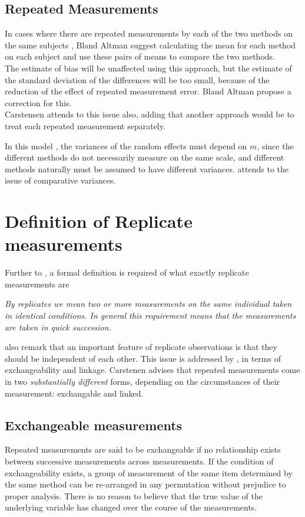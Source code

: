 \subsection{Repeated Measurements }
In cases where there are repeated measurements by each of the two
methods on the same subjects , Bland Altman suggest calculating
the mean for each method on each subject and use these pairs of
means to compare the two methods.
\\
The estimate of bias will be unaffected using this approach, but
the estimate of the standard deviation of the differences will be
too small, because of the reduction of the effect of repeated
measurement error. Bland Altman propose a correction for this.
\\
Carstensen attends to this issue also, adding that another
approach would be to treat each repeated measurement separately.


In this model , the variances of the random effects must depend on
$m$, since the different methods do not necessarily measure on the
same scale, and different methods naturally must be assumed to
have different variances. \citet{BXC2004} attends to the issue of
comparative variances.
\section{Definition of Replicate measurements}
Further to \citet{BA99}, a formal definition is required of what exactly replicate measurements are

\emph{By replicates we mean two or more measurements on the same
individual taken in identical conditions. In general this requirement means that the
measurements are taken in quick succession.}

\citet{BA99} also remark that an important feature of replicate observations is that they should be independent
of each other. This issue is addressed by \citet{bxc2010}, in terms of exchangeability and linkage. Carstenen advises that repeated measurements come in two \emph{substantially different} forms, depending on the circumstances of their measurement: exchangable and linked.
\subsection{Exchangeable measurements}
Repeated measurements are said to be exchangeable if no relationship exists between successive measurements across measurements. If the condition of exchangeability exists, a group of measurement of the same item determined by the same method can be re-arranged in any permutation without prejudice to proper analysis. There is no reason to believe that the true value of the underlying variable has changed over the course of the measurements.

